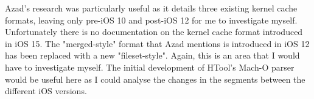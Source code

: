 Azad's research was particularly useful as it details three existing kernel cache formats, leaving only pre-iOS 10 and post-iOS 12 for me to investigate myself. Unfortunately there is no documentation on the kernel cache format introduced in iOS 15. The "merged-style" format that Azad mentions is introduced in iOS 12 has been replaced with a new "fileset-style". Again, this is an area that I would have to investigate myself. The initial development of HTool's Mach-O parser would be useful here as I could analyse the changes in the segments between the different iOS versions.




 
 
 
 
 
 
 
 
 
 
 
 
 
 
 
 

